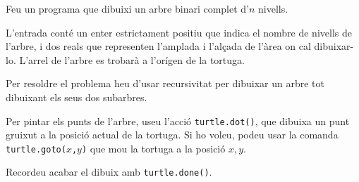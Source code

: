 

\Statement

Feu un programa que dibuixi un arbre binari complet d'$n$ nivells.

\Input

L'entrada conté un enter estrictament positiu que indica el nombre de nivells de l'arbre, i dos reals que representen l'amplada i l'alçada de l'àrea on cal dibuixar-lo. L'arrel de l'arbre es trobarà a l'orígen de la tortuga.

\Observation

Per resoldre el problema heu d'usar recursivitat per dibuixar un arbre tot dibuixant els seus dos subarbres.

\medskip

Per pintar els punts de l'arbre, useu l'acció \texttt{turtle.dot()}, que dibuixa un punt gruixut a la posició actual de la tortuga. Si ho voleu, podeu usar la comanda \texttt{turtle.goto($x$,$y$)} que mou la tortuga a la posició $x,y$.

\medskip

Recordeu acabar el dibuix amb \texttt{turtle.done()}.


\Sample
